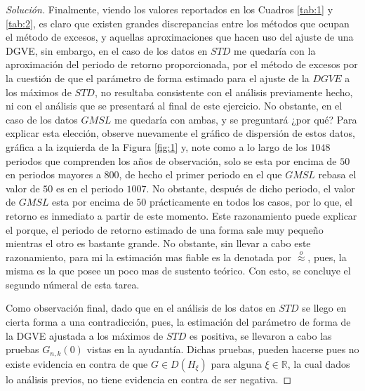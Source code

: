 \documentclass[10.5pt,notitlepage]{article}
\renewcommand{\qedsymbol}{$\blacksquare$}
\newenvironment{solucion}
  {\begin{proof}[Solución]}
  {\end{proof}}
\newcommand{\RR}{\mathbb{R}}
\theoremstyle{plain}
\newenvironment{rem}
  {\pushQED{\qed}\renewcommand{\qedsymbol}{$\triangle$}\remarkex}
  {\popQED\endremarkex}
\begin{document}
\begin{solucion}
Finalmente, viendo los valores reportados en los Cuadros \ref{tab:1} y \ref{tab:2}, es claro que existen grandes discrepancias entre los métodos que ocupan el método de excesos, y aquellas aproximaciones que hacen uso del ajuste de una DGVE, sin embargo, en el caso de los datos en \(STD\) me quedaría con la aproximación del periodo de retorno proporcionada, por el método de excesos por la cuestión de que el parámetro de forma estimado para el ajuste de la \(DGVE\) a los máximos de \(STD\), no resultaba consistente con el análisis previamente hecho, ni con el análisis que se presentará al final de este ejercicio. No obstante, en el caso de los datos \(GMSL\) me quedaría con ambas, y se preguntará ¿por qué? Para explicar esta elección, observe nuevamente el gráfico de dispersión de estos datos, gráfica a la izquierda de la Figura \ref{fig:1} y, note como a lo largo de los \(1048\) periodos que comprenden los años de observación, solo se esta por encima de \(50\) en periodos mayores a \(800\), de hecho el primer periodo en el que \(GMSL\) rebasa el valor de \(50\) es en el periodo \(1007\). No obstante, después de dicho periodo, el valor de \(GMSL\)  esta por encima de \(50\) prácticamente en todos los casos, por lo que, el retorno es inmediato a partir de este momento. Este razonamiento puede explicar el porque, el periodo de retorno estimado de una forma sale muy pequeño mientras el otro es bastante grande. No obstante, sin llevar a cabo este razonamiento, para mi la estimación mas fiable es la denotada por \(\overset{o}{\approx}\), pues, la misma es la que posee un poco mas de sustento teórico.  Con esto, se concluye el segundo númeral de esta tarea. 

\begin{rem}
Como observación final, dado que en el análisis de los datos en \(STD\) se llego en cierta forma a una contradicción, pues, la estimación del parámetro de forma de la DGVE ajustada a los máximos de \(STD\) es positiva, se llevaron a cabo las pruebas \(G_{n,k}(0)\) vistas en la ayudantía. Dichas pruebas, pueden hacerse pues no existe evidencia en contra de que \(G \in D(H_{\xi})\) para alguna \(\xi \in \RR\), la cual dados lo análisis previos, no tiene evidencia en contra de ser negativa. 


\end{rem}
\end{solucion}
\end{document}
